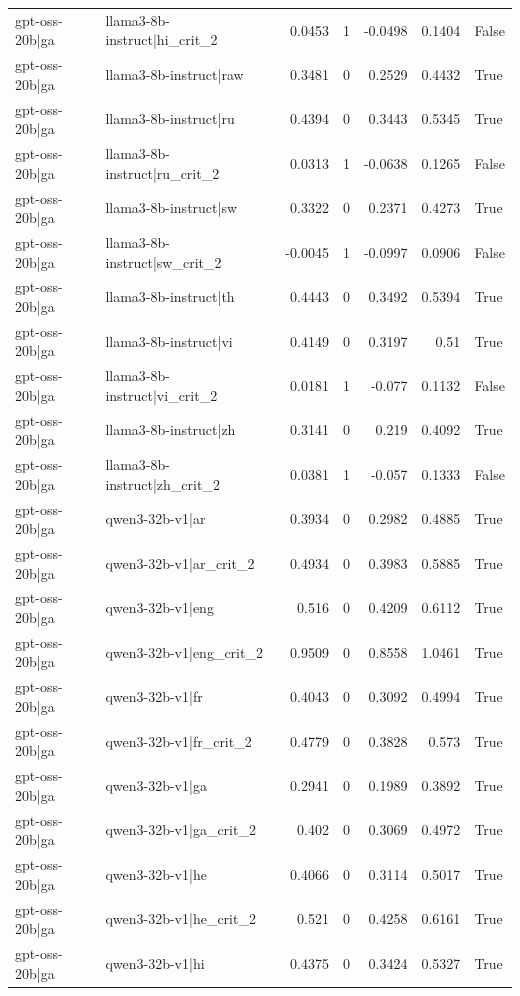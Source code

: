 \begin{table}
\begin{tabular}{l l r r r r l}
gpt-oss-20b|ga & llama3-8b-instruct|hi_crit_2 & 0.0453 & 1 & -0.0498 & 0.1404 & False \\
gpt-oss-20b|ga & llama3-8b-instruct|raw & 0.3481 & 0 & 0.2529 & 0.4432 & True \\
gpt-oss-20b|ga & llama3-8b-instruct|ru & 0.4394 & 0 & 0.3443 & 0.5345 & True \\
gpt-oss-20b|ga & llama3-8b-instruct|ru_crit_2 & 0.0313 & 1 & -0.0638 & 0.1265 & False \\
gpt-oss-20b|ga & llama3-8b-instruct|sw & 0.3322 & 0 & 0.2371 & 0.4273 & True \\
gpt-oss-20b|ga & llama3-8b-instruct|sw_crit_2 & -0.0045 & 1 & -0.0997 & 0.0906 & False \\
gpt-oss-20b|ga & llama3-8b-instruct|th & 0.4443 & 0 & 0.3492 & 0.5394 & True \\
gpt-oss-20b|ga & llama3-8b-instruct|vi & 0.4149 & 0 & 0.3197 & 0.51 & True \\
gpt-oss-20b|ga & llama3-8b-instruct|vi_crit_2 & 0.0181 & 1 & -0.077 & 0.1132 & False \\
gpt-oss-20b|ga & llama3-8b-instruct|zh & 0.3141 & 0 & 0.219 & 0.4092 & True \\
gpt-oss-20b|ga & llama3-8b-instruct|zh_crit_2 & 0.0381 & 1 & -0.057 & 0.1333 & False \\
gpt-oss-20b|ga & qwen3-32b-v1|ar & 0.3934 & 0 & 0.2982 & 0.4885 & True \\
gpt-oss-20b|ga & qwen3-32b-v1|ar_crit_2 & 0.4934 & 0 & 0.3983 & 0.5885 & True \\
gpt-oss-20b|ga & qwen3-32b-v1|eng & 0.516 & 0 & 0.4209 & 0.6112 & True \\
gpt-oss-20b|ga & qwen3-32b-v1|eng_crit_2 & 0.9509 & 0 & 0.8558 & 1.0461 & True \\
gpt-oss-20b|ga & qwen3-32b-v1|fr & 0.4043 & 0 & 0.3092 & 0.4994 & True \\
gpt-oss-20b|ga & qwen3-32b-v1|fr_crit_2 & 0.4779 & 0 & 0.3828 & 0.573 & True \\
gpt-oss-20b|ga & qwen3-32b-v1|ga & 0.2941 & 0 & 0.1989 & 0.3892 & True \\
gpt-oss-20b|ga & qwen3-32b-v1|ga_crit_2 & 0.402 & 0 & 0.3069 & 0.4972 & True \\
gpt-oss-20b|ga & qwen3-32b-v1|he & 0.4066 & 0 & 0.3114 & 0.5017 & True \\
gpt-oss-20b|ga & qwen3-32b-v1|he_crit_2 & 0.521 & 0 & 0.4258 & 0.6161 & True \\
gpt-oss-20b|ga & qwen3-32b-v1|hi & 0.4375 & 0 & 0.3424 & 0.5327 & True \\

\end{tabular}
\end{table}
